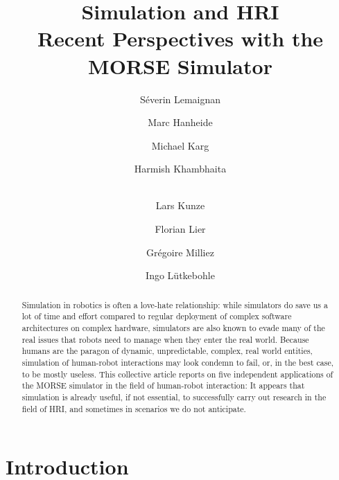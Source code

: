 \documentclass{llncs}
\begin{document}
\title{Simulation and HRI\\Recent Perspectives with the MORSE Simulator}

\author{
Séverin Lemaignan \and 
Marc Hanheide \and 
Michael Karg \and 
Harmish Khambhaita \and \\
Lars Kunze \and 
Florian Lier \and 
Grégoire Milliez \and 
Ingo Lütkebohle}





\maketitle

\begin{abstract}

Simulation in robotics is often a love-hate relationship: while simulators do
save us a lot of time and effort compared to regular deployment of complex
software architectures on complex hardware, simulators are also known to evade
many of the real issues that robots need to manage when they enter
the real world.  Because humans are the paragon of dynamic, unpredictable,
complex, real world entities, simulation of human-robot interactions may look
condemn to fail, or, in the best case, to be mostly useless. This collective
article reports on five independent applications of the MORSE simulator in the
field of human-robot interaction: It appears that simulation is already useful,
if not essential, to successfully carry out research in the field of HRI, and
sometimes in scenarios we do not anticipate.

\end{abstract}

\section{Introduction}
\end{document}
